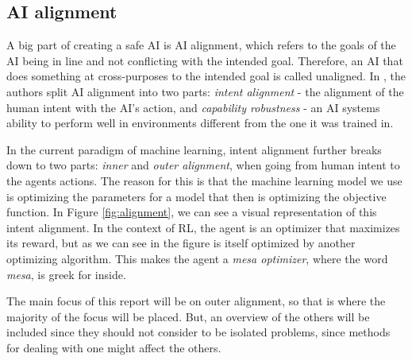 \documentclass[12pt,A4]{report}
\theoremstyle{definition}
\begin{document}
\subsection{AI alignment}


A big part of creating a safe AI is AI alignment, which refers to the goals of the AI being in line and not conflicting with the intended goal. Therefore, an AI that does something at cross-purposes to the intended goal is called unaligned. In \citet{Hubringer}, the authors split AI alignment into two parts: \textit{intent alignment} - the alignment of the human intent with the AI's action, and \textit{capability robustness} - an AI systems ability to perform well in environments different from the one it was trained in. 

In the current paradigm of machine learning, intent alignment further breaks down to two parts: \textit{inner} and \textit{outer alignment}, when going from human intent to the agents actions. The reason for this is that the machine learning model we use is optimizing the parameters for a model that then is optimizing the objective function. In Figure \ref{fig:alignment}, we can see a visual representation of this intent alignment. In the context of RL, the agent is an optimizer that maximizes its reward, but as we can see in the figure is itself optimized by another optimizing algorithm. This makes the agent a \textit{mesa optimizer}, where the word \textit{mesa}, is greek for inside. 

The main focus of this report will be on outer alignment, so that is where the majority of the focus will be placed. But, an overview of the others will be included since they should not consider to be isolated problems, since methods for dealing with one might affect the others.

\end{document}
